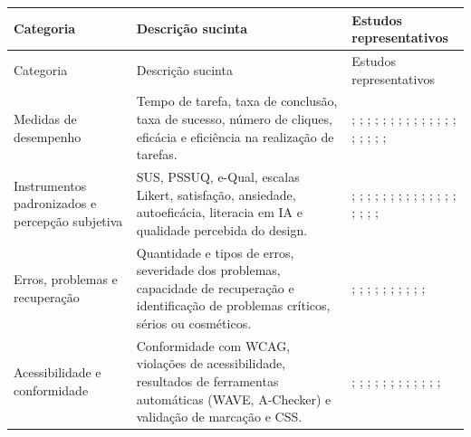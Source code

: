 \begin{longtable}{|p{3.2cm}|p{6cm}|p{5.8cm}|}
\hline
Categoria & Descrição sucinta & Estudos representativos \\ \hline
\endfirsthead
\hline
Categoria & Descrição sucinta & Estudos representativos \\ \hline
\endhead
\hline
\endfoot
\endlastfoot
Medidas de desempenho &
Tempo de tarefa, taxa de conclusão, taxa de sucesso, número de cliques, eficácia e eficiência na realização de tarefas. &
\cite{weighted_heuristic}; \cite{gatsou2017seniors}; \cite{xie2010usability}; \cite{ramineni2024enhancing}; \cite{delara2016study}; \cite{vaughan2006why}; \cite{zaphiris2003age}; \cite{arfaa2015usability}; \cite{sharit2008information}; \cite{finn2013usability}; \cite{lum2016development}; \cite{romano2013age}; \cite{crabb2014age}; \cite{hart2008evaluating}; \cite{jonasson2007expert}; \cite{patsoule2012redesigning}; \cite{molina2011using}; \cite{biswas2014interface}; \cite{artis2006effects}; \cite{becker2004study} \\ \hline
Instrumentos padronizados e percepção subjetiva &
SUS, PSSUQ, e-Qual, escalas Likert, satisfação, ansiedade, autoeficácia, literacia em IA e qualidade percebida do design. &
\cite{weighted_heuristic}; \cite{nosseir2011novice}; \cite{allah2021empathy}; \cite{barron2013feasibility}; \cite{cowan2011exploring}; \cite{crabb2014age}; \cite{mastarone2007access}; \cite{lee2021factors}; \cite{secure_messaging}; \cite{delara2016study}; \cite{almahmud2022developing}; \cite{arfaa2015usability}; \cite{romano2013age}; \cite{jonasson2007expert}; \cite{hart2008evaluating}; \cite{patsoule2012redesigning}; \cite{gatsou2017seniors}; \cite{sharit2008information}; \cite{kanjanakuha2019comprehensibility} \\ \hline
Erros, problemas e recuperação &
Quantidade e tipos de erros, severidade dos problemas, capacidade de recuperação e identificação de problemas críticos, sérios ou cosméticos. &
\cite{secure_messaging}; \cite{skov2009conceptual}; \cite{taylor2009using}; \cite{filgueiras2009recoverability}; \cite{weighted_heuristic}; \cite{xie2010usability}; \cite{zaphiris2003age}; \cite{patsoule2012redesigning}; \cite{mowar2025codea11y}; \cite{hornbaek2004usability}; \cite{hart2008evaluating} \\ \hline
Acessibilidade e conformidade &
Conformidade com WCAG, violações de acessibilidade, resultados de ferramentas automáticas (WAVE, A-Checker) e validação de marcação e CSS. &
\cite{kouroupetroglou2016methodological}; \cite{trilar2021family}; \cite{dombrovskaia2021guideline}; \cite{chiriboga2025accessible}; \cite{wickramathilaka2023addressing}; \cite{mowar2025codea11y}; \cite{gonzalez2025augmenting}; \cite{sun2010preliminary}; \cite{halbach2009framework}; \cite{darvishy2013inclusive}; \cite{biswas2014interface}; \cite{park2015personalized}; \cite{becker2004study} \\ \hline

\end{longtable}
